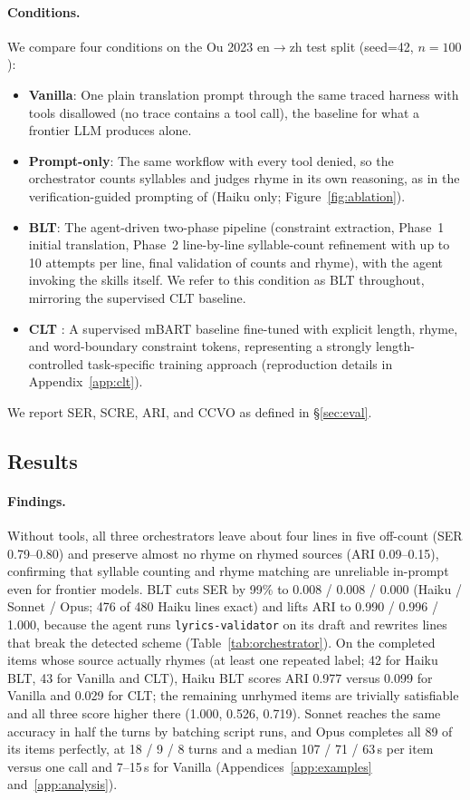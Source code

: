 \documentclass[11pt]{article}
\begin{document}
\paragraph{Conditions.}
We compare four conditions on the Ou 2023 en$\rightarrow$zh test split (seed=42, $n{=}100$):
\begin{itemize}
    \item \textbf{Vanilla}: One plain translation prompt through the same traced harness with tools disallowed (no trace contains a tool call), the baseline for what a frontier LLM produces alone.
    \item \textbf{Prompt-only}: The same workflow with every tool denied, so the orchestrator counts syllables and judges rhyme in its own reasoning, as in the verification-guided prompting of \citet{liu-etal-2026-towards} (Haiku only; Figure~\ref{fig:ablation}).
    \item \textbf{BLT}: The agent-driven two-phase pipeline (constraint extraction, Phase~1 initial translation, Phase~2 line-by-line syllable-count refinement with up to 10 attempts per line, final validation of counts and rhyme), with the agent invoking the skills itself. We refer to this condition as BLT throughout, mirroring the supervised CLT baseline.
    \item \textbf{CLT} \citep{ou-etal-2023-songs}: A supervised mBART baseline fine-tuned with explicit length, rhyme, and word-boundary constraint tokens, representing a strongly length-controlled task-specific training approach (reproduction details in Appendix~\ref{app:clt}).
\end{itemize}
We report SER, SCRE, ARI, and CCVO as defined in \S\ref{sec:eval}.

\subsection{Results}
\label{sec:orchestrator-ablation}

\paragraph{Findings.}
Without tools, all three orchestrators leave about four lines in five off-count (SER 0.79--0.80) and preserve almost no rhyme on rhymed sources (ARI 0.09--0.15), confirming that syllable counting and rhyme matching are unreliable in-prompt even for frontier models.
BLT cuts SER by 99\% to 0.008 / 0.008 / 0.000 (Haiku / Sonnet / Opus; 476 of 480 Haiku lines exact) and lifts ARI to 0.990 / 0.996 / 1.000, because the agent runs \texttt{lyrics-validator} on its draft and rewrites lines that break the detected scheme (Table~\ref{tab:orchestrator}).
On the completed items whose source actually rhymes (at least one repeated label; 42 for Haiku BLT, 43 for Vanilla and CLT), Haiku BLT scores ARI 0.977 versus 0.099 for Vanilla and 0.029 for CLT; the remaining unrhymed items are trivially satisfiable and all three score higher there (1.000, 0.526, 0.719).
Sonnet reaches the same accuracy in half the turns by batching script runs, and Opus completes all 89 of its items perfectly, at 18 / 9 / 8 turns and a median 107 / 71 / 63\,s per item versus one call and 7--15\,s for Vanilla (Appendices~\ref{app:examples} and~\ref{app:analysis}).
\end{document}
